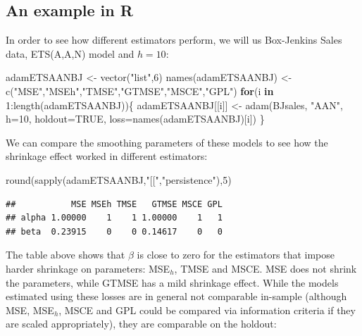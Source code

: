 \documentclass[
]{book}
\newenvironment{Shaded}{\begin{snugshade}}{\end{snugshade}}
\newcommand{\AttributeTok}[1]{\textcolor[rgb]{0.77,0.63,0.00}{#1}}
\newcommand{\ConstantTok}[1]{\textcolor[rgb]{0.00,0.00,0.00}{#1}}
\newcommand{\ControlFlowTok}[1]{\textcolor[rgb]{0.13,0.29,0.53}{\textbf{#1}}}
\newcommand{\DecValTok}[1]{\textcolor[rgb]{0.00,0.00,0.81}{#1}}
\newcommand{\FunctionTok}[1]{\textcolor[rgb]{0.00,0.00,0.00}{#1}}
\newcommand{\NormalTok}[1]{#1}
\newcommand{\OtherTok}[1]{\textcolor[rgb]{0.56,0.35,0.01}{#1}}
\newcommand{\SpecialCharTok}[1]{\textcolor[rgb]{0.00,0.00,0.00}{#1}}
\newcommand{\StringTok}[1]{\textcolor[rgb]{0.31,0.60,0.02}{#1}}
\theoremstyle{definition}
\theoremstyle{definition}
\theoremstyle{definition}
\theoremstyle{definition}
\theoremstyle{remark}
\begin{document}
\hypertarget{an-example-in-r-2}{%
\subsection{An example in R}\label{an-example-in-r-2}}

In order to see how different estimators perform, we will us Box-Jenkins Sales data, ETS(A,A,N) model and \(h=10\):

\begin{Shaded}
\begin{Highlighting}[]
\NormalTok{adamETSAANBJ }\OtherTok{\textless{}{-}} \FunctionTok{vector}\NormalTok{(}\StringTok{"list"}\NormalTok{,}\DecValTok{6}\NormalTok{)}
\FunctionTok{names}\NormalTok{(adamETSAANBJ) }\OtherTok{\textless{}{-}} \FunctionTok{c}\NormalTok{(}\StringTok{"MSE"}\NormalTok{,}\StringTok{"MSEh"}\NormalTok{,}\StringTok{"TMSE"}\NormalTok{,}\StringTok{"GTMSE"}\NormalTok{,}\StringTok{"MSCE"}\NormalTok{,}\StringTok{"GPL"}\NormalTok{)}
\ControlFlowTok{for}\NormalTok{(i }\ControlFlowTok{in} \DecValTok{1}\SpecialCharTok{:}\FunctionTok{length}\NormalTok{(adamETSAANBJ))\{}
\NormalTok{    adamETSAANBJ[[i]] }\OtherTok{\textless{}{-}} \FunctionTok{adam}\NormalTok{(BJsales, }\StringTok{"AAN"}\NormalTok{, }\AttributeTok{h=}\DecValTok{10}\NormalTok{, }\AttributeTok{holdout=}\ConstantTok{TRUE}\NormalTok{,}
                              \AttributeTok{loss=}\FunctionTok{names}\NormalTok{(adamETSAANBJ)[i])}
\NormalTok{\}}
\end{Highlighting}
\end{Shaded}

We can compare the smoothing parameters of these models to see how the shrinkage effect worked in different estimators:

\begin{Shaded}
\begin{Highlighting}[]
\FunctionTok{round}\NormalTok{(}\FunctionTok{sapply}\NormalTok{(adamETSAANBJ,}\StringTok{"[["}\NormalTok{,}\StringTok{"persistence"}\NormalTok{),}\DecValTok{5}\NormalTok{)}
\end{Highlighting}
\end{Shaded}

\begin{verbatim}
##           MSE MSEh TMSE   GTMSE MSCE GPL
## alpha 1.00000    1    1 1.00000    1   1
## beta  0.23915    0    0 0.14617    0   0
\end{verbatim}

The table above shows that \(\beta\) is close to zero for the estimators that impose harder shrinkage on parameters: MSE\(_h\), TMSE and MSCE. MSE does not shrink the parameters, while GTMSE has a mild shrinkage effect. While the models estimated using these losses are in general not comparable in-sample (although MSE, MSE\(_h\), MSCE and GPL could be compared via information criteria if they are scaled appropriately), they are comparable on the holdout:
\end{document}
